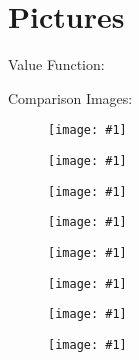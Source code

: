 \documentclass[a4paper,10pt,fleqn]{article}
\newcommand{\filename}{FILENAME}
\newcommand\draw[1]{
	\begin{figure}[!ht]
	\centering
	\texttt{[image: \#1]}
	\end{figure}
	\newline
}
\newif\ifdrawvalue
\begin{document}
 
 
\section{Pictures}

\drawvaluetrue

\ifdrawvalue
Value Function:
\newline
\fi

Comparison Images:
\draw{\filename-Nodes.eps}
\draw{\filename-Leaves.eps}
\draw{\filename-Branches.eps}
\draw{\filename-Memory.eps}
\draw{\filename-Time.eps}
\draw{\filename-TotTime.eps}
\draw{\filename-MaxVal.eps}
\draw{\filename-MaxErr.eps}
  
\end{document}
